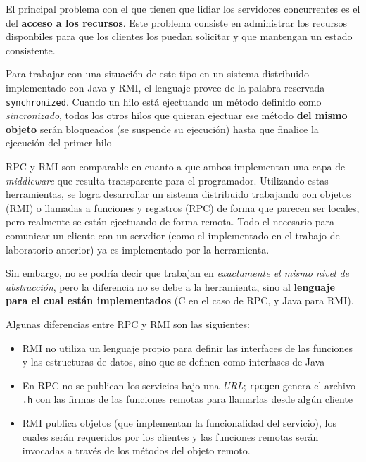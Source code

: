 El principal problema con el que tienen que lidiar los servidores concurrentes es el del \textbf{acceso a los recursos}. Este problema consiste en administrar los recursos disponbiles para que los clientes los puedan solicitar y que mantengan un estado consistente. 

Para trabajar con una situación de este tipo en un sistema distribuido implementado con Java y RMI, el lenguaje provee de la palabra reservada \texttt{synchronized}. Cuando un hilo está ejectuando un método definido como \emph{sincronizado}, todos los otros hilos que quieran ejectuar ese método \textbf{del mismo objeto} serán bloqueados (se suspende su ejecución) hasta que finalice la ejecución del primer hilo \autocite{SynchronizedMethods}

RPC y RMI son comparable en cuanto a que ambos implementan una capa de \emph{middleware} que resulta transparente para el programador. Utilizando estas herramientas, se logra desarrollar un sistema distribuido trabajando con objetos (RMI) o llamadas a funciones y registros (RPC) de forma que parecen ser locales, pero realmente se están ejectuando de forma remota. Todo el  necesario para comunicar un cliente con un servdior (como el implementado en el trabajo de laboratorio anterior) ya es implementado por la herramienta.

Sin embargo, no se podría decir que trabajan en \emph{exactamente el mismo nivel de abstracción}, pero la diferencia no se debe a la herramienta, sino al \textbf{lenguaje para el cual están implementados} (C en el caso de RPC, y Java para RMI).  

Algunas diferencias entre RPC y RMI son las siguientes:

\begin{itemize}
    \item RMI no utiliza un lenguaje propio para definir las interfaces de las funciones y las estructuras de datos, sino que se definen como interfases de Java
    \item En RPC no se publican los servicios bajo una \emph{URL}; \texttt{rpcgen} genera el archivo \texttt{.h} con las firmas de las funciones remotas para llamarlas desde algún cliente  
    \item RMI publica objetos (que implementan la funcionalidad del servicio), los cuales serán requeridos por los clientes y las funciones remotas serán invocadas a través de los métodos del objeto remoto.
\end{itemize}





\clearpage
\printbibliography



